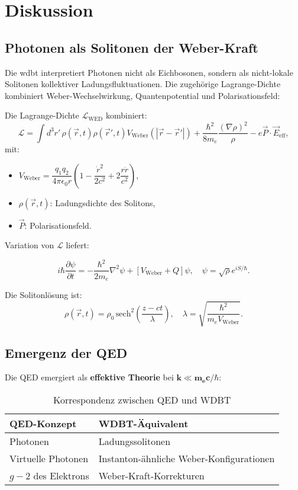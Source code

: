\chapter{Diskussion}

\section{Photonen als Solitonen der Weber-Kraft}
Die \gls{wdbt} interpretiert Photonen nicht als Eichbosonen, sondern als nicht-lokale Solitonen kollektiver Ladungsfluktuationen. Die zugehörige Lagrange-Dichte kombiniert Weber-Wechselwirkung,
Quantenpotential und Polarisationsfeld:

Die Lagrange-Dichte $\mathcal{L}_{\text{WED}}$ kombiniert:  
\begin{equation}
\mathcal{L} = \int d^3r'\, \rho(\vec{r},t) \rho(\vec{r}',t) V_{\text{Weber}}(|\vec{r}-\vec{r}'|) + \frac{\hbar^2}{8m_e} \frac{(\nabla \rho)^2}{\rho} - e \vec{P} \cdot \vec{E}_{\text{eff}},
\end{equation}
mit:
\begin{itemize}
    \item $V_{\text{Weber}} = \dfrac{q_1 q_2}{4\pi \epsilon_0 r} \left(1 - \dfrac{\dot{r}^2}{2c^2} + 2 \dfrac{r \ddot{r}}{c^2}\right)$,
    \item $\rho(\vec{r},t)$: Ladungsdichte des Solitons,
    \item $\vec{P}$: Polarisationsfeld.
\end{itemize}

Variation von $\mathcal{L}$ liefert:  

\begin{equation}
i\hbar \frac{\partial \psi}{\partial t} = -\frac{\hbar^2}{2m_e} \nabla^2 \psi + \left[ V_{\text{Weber}} + Q \right] \psi, \quad \psi = \sqrt{\rho} e^{iS/\hbar}.
\end{equation}

Die Solitonlösung ist:
\begin{equation}
\rho(\vec{r},t) = \rho_0 \, \text{sech}^2\left(\frac{z - ct}{\lambda}\right), \quad \lambda = \sqrt{\frac{\hbar^2}{m_e V_{\text{Weber}}}}.
\end{equation}

\section{Emergenz der QED}
Die QED emergiert als \textbf{effektive Theorie} bei $\mathbf{k \ll m_e c/\hbar}$:

\begin{table}[ht]
\centering
\begin{tabular}{ll}
\toprule
\textbf{QED-Konzept} & \textbf{WDBT-Äquivalent} \\
\midrule
Photonen & Ladungssolitonen \\
Virtuelle Photonen & Instanton-ähnliche Weber-Konfigurationen \\
$g-2$ des Elektrons & Weber-Kraft-Korrekturen \\
\bottomrule
\end{tabular}
\caption{Korrespondenz zwischen QED und WDBT}
\end{table}

